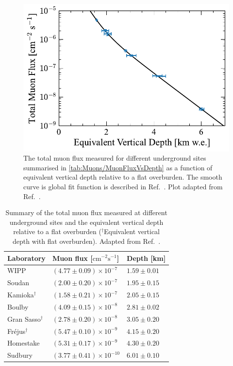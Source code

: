 \begin{figure}[h!]
    \centering
    \includegraphics[width=0.7\linewidth]{figures/Muons/Flux_Depth_Plot.pdf}
    \caption[The total muon flux measured for different underground sites.]{The total muon flux measured for different underground sites summarised in \autoref{tab:Muons/MuonFluxVsDepth} as a function of equivalent vertical depth relative to a flat overburden. The smooth curve is global fit function is described in Ref.~\cite{mei}. Plot adapted from Ref.~\cite{mei}.}
    \label{fig:Muons/MuonFluxVsDepth}
\end{figure}

\begin{table}[h!]
    \centering
    \caption[Summary of the total muon flux measured at different underground sites and the equivalent vertical depth relative to a flat overburden.]{Summary of the total muon flux measured at different underground sites and the equivalent vertical depth relative to a flat overburden ($^\dagger$Equivalent vertical depth with flat overburden). Adapted from Ref.~\cite{mei}.}
    \label{tab:Muons/MuonFluxVsDepth}
    \begin{tabular}{lll}
        \hline\hline
        \textbf{Laboratory} & \textbf{Muon flux [$\text{cm}^{-2}\text{s}^{-1}$]}&\textbf{Depth [km]}\\
        \hline
        WIPP & $(4.77 \pm 0.09) \times 10^{-7}$ & $1.59 \pm 0.01$ \\
        Soudan & $(2.00 \pm 0.20) \times 10^{-7}$ & $1.95 \pm 0.15$ \\
        Kamioka$^\dagger$ & $(1.58 \pm 0.21) \times 10^{-7}$ & $2.05 \pm 0.15$ \\
        Boulby & $(4.09 \pm 0.15) \times 10^{-8}$ & $2.81 \pm 0.02$ \\
        Gran Sasso$^\dagger$& $(2.78 \pm 0.20) \times 10^{-8}$ & $3.05 \pm 0.20$ \\
        Fréjus$^\dagger$ & $(5.47 \pm 0.10) \times 10^{-9}$ & $4.15 \pm 0.20$ \\
        Homestake & $(5.31 \pm 0.17) \times 10^{-9}$ & $4.30 \pm 0.20$ \\
        Sudbury & $(3.77 \pm 0.41) \times 10^{-10}$ & $6.01 \pm 0.10$ \\
        \hline\hline
    \end{tabular}
\end{table}

